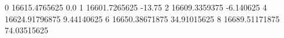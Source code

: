 0 16615.4765625 0.0
1 16601.7265625 -13.75
2 16609.3359375 -6.140625
4 16624.91796875 9.44140625
6 16650.38671875 34.91015625
8 16689.51171875 74.03515625
